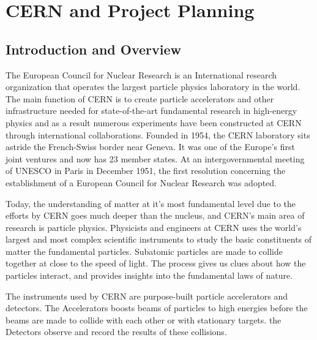 \let\textcircled=\pgftextcircled
\chapter{CERN and Project Planning}
\label{chap:ch3}

\section{Introduction and Overview}
The European Council for Nuclear Research is an International research organization that operates the largest particle physics laboratory in the world.  The main function of CERN is to create particle accelerators and other infrastructure needed for state-of-the-art fundamental research in high-energy physics and as a result numerous experiments have been constructed at CERN through international collaborations. Founded in 1954, the CERN laboratory sits astride the French-Swiss border near Geneva. It was one of the Europe's first joint ventures and now has 23 member states. At an intergovernmental meeting of UNESCO in Paris in December 1951, the first resolution concerning the establishment of a European Council for Nuclear Research was adopted.

Today, the understanding of matter at it's most fundamental level due to the efforts by CERN goes much deeper than the nucleus, and CERN's main area of research is particle physics. Physicists and engineers at CERN uses the world's largest and most complex scientific instruments to study the basic constituents of matter the fundamental particles. Subatomic particles are made to collide together at close to the speed of light. The process gives us clues about how the particles interact, and provides insights into the fundamental laws of nature.

The instruments used by CERN are purpose-built particle accelerators and detectors. The Accelerators boosts beams of particles to high energies before the beams are made to collide with each other or with stationary targets. the Detectors observe and record the results of these collisions.

